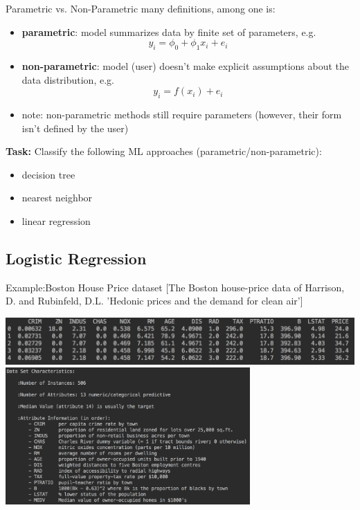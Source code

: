 \documentclass{beamer}
\begin{document}
\begin{frame}{Parametric vs. Non-Parametric}
many definitions, among one is:
\begin{itemize}
\item \textbf{parametric}: model summarizes data by finite set of parameters, e.g. $$y_i=\boxed{\phi_0 + \phi_1x_i} + e_i$$
\item \textbf{non-parametric}: model (user) doesn't make explicit assumptions about the data distribution, e.g. $$y_i = \boxed{f(x_i)} + e_i$$
\item note: non-parametric methods still require parameters (however, their form isn't defined by the user)
\end{itemize}
\textbf{Task:} Classify the following ML approaches (parametric/non-parametric):
\begin{itemize}
\item decision tree
\item nearest neighbor
\item linear regression
\end{itemize}
\end{frame}


\subsection{Logistic Regression}

\begin{frame}{Example:Boston House Price dataset}
[The Boston house-price data of Harrison, D. and Rubinfeld, D.L. 'Hedonic
prices and the demand for clean air']
\begin{center}
\includegraphics[width=1\textwidth]{boston}\\
\includegraphics[width=0.7\textwidth, trim=0 9cm 0 0cm]{boston_descr}
\end{center}
\end{frame}
\end{document}
